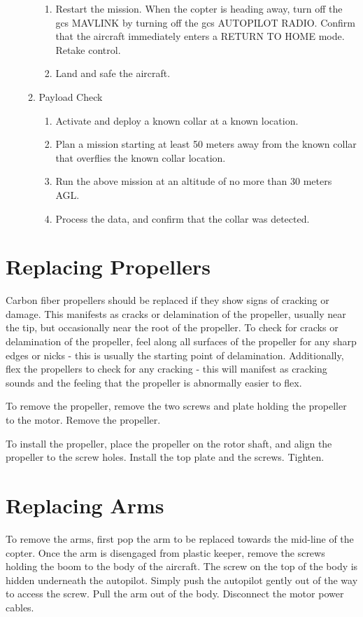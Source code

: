 \documentclass{report}
\begin{document}
\begin{enumerate}
\begin{enumerate}
\begin{enumerate}
							\item Restart the mission.  When the copter is heading away, turn off the \gls{gcs} MAVLINK by turning off the \gls{gcs} AUTOPILOT RADIO.  Confirm that the aircraft immediately enters a RETURN TO HOME mode.  Retake control.
							\item Land and safe the aircraft.
						\end{enumerate}
					\item Payload Check
						\begin{enumerate}
							\item Activate and deploy a known collar at a known location.
							\item Plan a mission starting at least 50 meters away from the known collar that overflies the known collar location.
							\item Run the above mission at an altitude of no more than 30 meters AGL.
							\item Process the data, and confirm that the collar was detected.
						\end{enumerate}
				\end{enumerate}
		\end{enumerate}
	\section{Replacing Propellers}
		Carbon fiber propellers should be replaced if they show signs of cracking or damage.  This manifests as cracks or delamination of the propeller, usually near the tip, but occasionally near the root of the propeller.  To check for cracks or delamination of the propeller, feel along all surfaces of the propeller for any sharp edges or nicks - this is usually the starting point of delamination.  Additionally, flex the propellers to check for any cracking - this will manifest as cracking sounds and the feeling that the propeller is abnormally easier to flex.

		To remove the propeller, remove the two screws and plate holding the propeller to the motor.  Remove the propeller.

		To install the propeller, place the propeller on the rotor shaft, and align the propeller to the screw holes.  Install the top plate and the screws.  Tighten.
	\section{Replacing Arms}
		To remove the arms, first pop the arm to be replaced towards the mid-line of the copter.  Once the arm is disengaged from plastic keeper, remove the screws holding the boom to the body of the aircraft.  The screw on the top of the body is hidden underneath the autopilot.  Simply push the autopilot gently out of the way to access the screw.  Pull the arm out of the body.  Disconnect the motor power cables.
\end{document}

